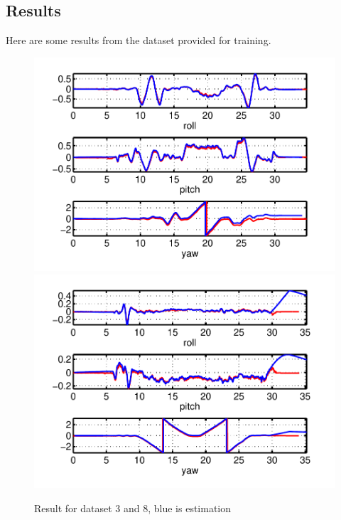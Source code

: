 \documentclass[twoside]{article}
\begin{document}
\begin{multicols}{2}

\section{Results}
Here are some results from the dataset provided for training.
\begin{figure}[H]
\centering
\includegraphics[width=\columnwidth]{fig/data3.pdf} 
\includegraphics[width=\columnwidth]{fig/data8.pdf} 
\caption{Result for dataset 3 and 8, blue is estimation}
\label{fig:estimation}
\end{figure}


\end{multicols}
\end{document}
